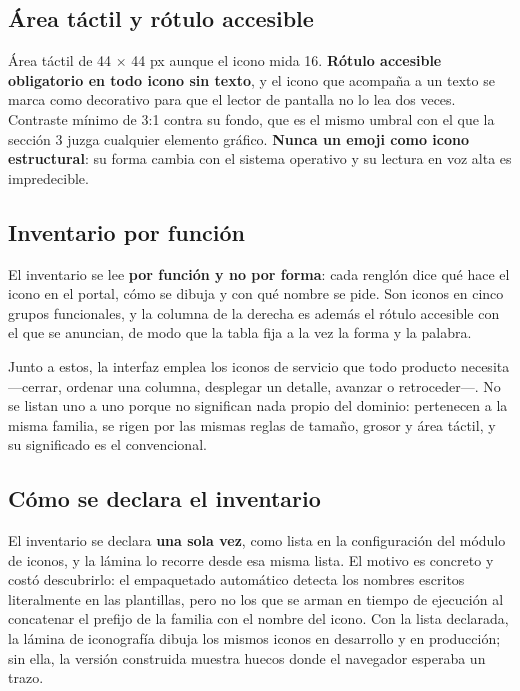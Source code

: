 \subsection{Área táctil y rótulo accesible}

Área táctil de 44 × 44 px aunque el icono mida 16. \textbf{Rótulo accesible obligatorio en todo icono sin texto}, y el icono que acompaña a un texto se marca como decorativo para que el lector de pantalla no lo lea dos veces. Contraste mínimo de 3:1 contra su fondo, que es el mismo umbral con el que la sección 3 juzga cualquier elemento gráfico. \textbf{Nunca un emoji como icono estructural}: su forma cambia con el sistema operativo y su lectura en voz alta es impredecible.

\subsection{Inventario por función}

El inventario se lee \textbf{por función y no por forma}: cada renglón dice qué hace el icono en el portal, cómo se dibuja y con qué nombre se pide. Son \textbf{\cifraIconosDeclarados{}} iconos en cinco grupos funcionales, y la columna de la derecha es además el rótulo accesible con el que se anuncian, de modo que la tabla fija a la vez la forma y la palabra.



Junto a estos, la interfaz emplea los iconos de servicio que todo producto necesita ---cerrar, ordenar una columna, desplegar un detalle, avanzar o retroceder---. No se listan uno a uno porque no significan nada propio del dominio: pertenecen a la misma familia, se rigen por las mismas reglas de tamaño, grosor y área táctil, y su significado es el convencional.

\subsection{Cómo se declara el inventario}

El inventario se declara \textbf{una sola vez}, como lista en la configuración del módulo de iconos, y la lámina lo recorre desde esa misma lista. El motivo es concreto y costó descubrirlo: el empaquetado automático detecta los nombres escritos literalmente en las plantillas, pero no los que se arman en tiempo de ejecución al concatenar el prefijo de la familia con el nombre del icono. Con la lista declarada, la lámina de iconografía dibuja los mismos iconos en desarrollo y en producción; sin ella, la versión construida muestra huecos donde el navegador esperaba un trazo.

